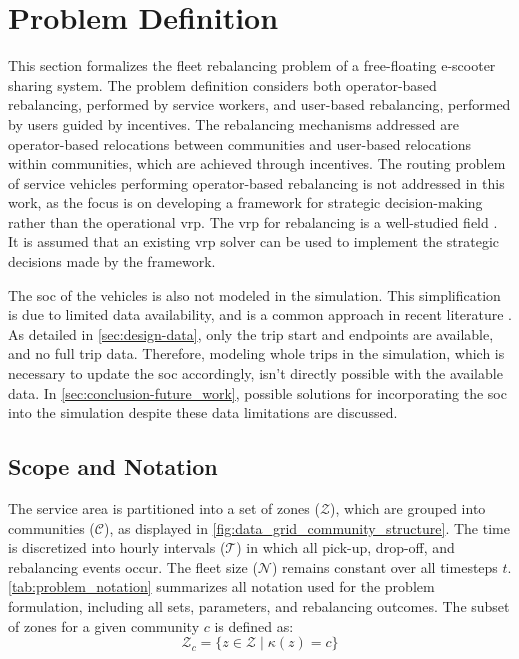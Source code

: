 \section{Problem Definition}\label{sec:design-problem_definition}
This section formalizes the fleet rebalancing problem of a free-floating e-scooter sharing system.
The problem definition considers both operator-based rebalancing, performed by service workers, and user-based rebalancing, performed by users guided by incentives.
The rebalancing mechanisms addressed are operator-based relocations between communities and user-based relocations within communities, which are achieved through incentives.
The routing problem of service vehicles performing operator-based rebalancing is not addressed in this work, as the focus is on developing a framework for strategic decision-making rather than the operational \gls{vrp}.
The \gls{vrp} for rebalancing is a well-studied field \cite{emami_integrated_2024, jimenez-merono_optimization_2024, lee_battery_2024, sanchez_simulation_2022, paparella_optimization-based_2023}.
It is assumed that an existing \gls{vrp} solver can be used to implement the strategic decisions made by the framework.

The \gls{soc} of the vehicles is also not modeled in the simulation.
This simplification is due to limited data availability, and is a common approach in recent literature \cite{villa-zapata_incorporating_2024, cederle_fairness-oriented_2025, pan_deep_2019, schofield_handling_2021}.
As detailed in \autoref{sec:design-data}, only the trip start and endpoints are available, and no full trip data.
Therefore, modeling whole trips in the simulation, which is necessary to update the \gls{soc} accordingly, isn't directly possible with the available data.
In \autoref{sec:conclusion-future_work}, possible solutions for incorporating the \gls{soc} into the simulation despite these data limitations are discussed.

\subsection{Scope and Notation}\label{sec:design-problem_definition-notation}
The service area is partitioned into a set of zones ($\mathcal{Z}$), which are grouped into communities ($\mathcal{C}$), as displayed in \autoref{fig:data_grid_community_structure}.
The time is discretized into hourly intervals ($\mathcal{T}$) in which all pick-up, drop-off, and rebalancing events occur.
The fleet size ($\mathcal{N}$) remains constant over all timesteps $t$.
\autoref{tab:problem_notation} summarizes all notation used for the problem formulation, including all sets, parameters, and rebalancing outcomes.
The subset of zones for a given community $c$ is defined as:
\begin{equation}
    \mathcal{Z}_c = \{z \in \mathcal{Z} \mid \kappa(z) = c\}
\end{equation}

